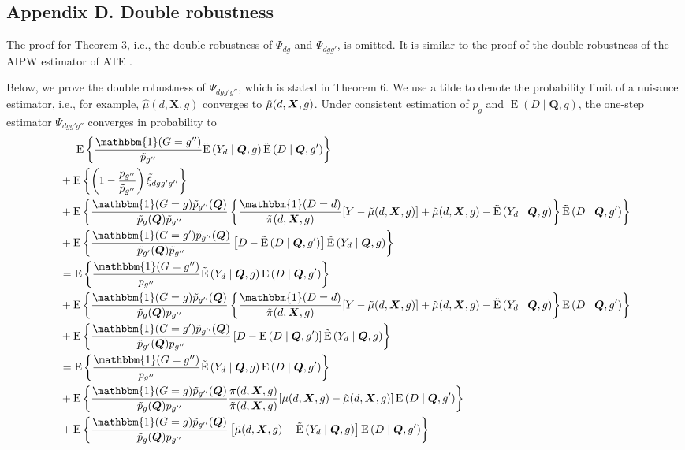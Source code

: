 \documentclass[12pt,a4paper]{article}
\newcommand{\E}{\operatorname{E}}
\def\X{{\boldsymbol X}}
\def\Q{{\boldsymbol Q}}
\def\one{\mathbbm{1}}
\begin{document}
\subsection*{Appendix D. Double robustness}
The proof for Theorem 3, i.e., the double robustness of $\Psi_{dg}$ and $\Psi_{dgg'}$, is omitted. It is similar to the proof of the double robustness of the AIPW estimator of ATE \citep{robins_estimation_1994, tsiatis_semiparametric_2006}.

Below, we prove the double robustness of $\Psi_{dgg'g''}$, which is stated in Theorem 6. 
We use a tilde to denote the probability limit of a nuisance estimator, i.e., for example, $\hat{\mu}(d,\X,g)$ converges to $\Tilde{\mu}(d,\X,g)$. 
Under consistent estimation of $p_g$ and $\E(D \mid \Q, g)$, the one-step estimator $\Psi_{dgg'g''}$ converges in probability to 
\begin{align*}
    &\phantom{{}={}} \E \left\{ \frac{\one(G=g'')}{\Tilde{p}_{g''}} \Tilde{\E} \left(Y_d \mid \Q, g \right) \Tilde{\E} \left(D \mid \Q, g' \right) \right\} \\
    &+ \E \left\{ \left( 1- \frac{p_{g''}}{\Tilde{p}_{g''}} \right) \Tilde{\xi}_{dgg'g''} \right\} \\
    &+ \E \left\{ \frac{\one(G=g) \Tilde{p}_{g''}(\Q)}{\Tilde{p}_g(\Q)\Tilde{p}_{g''}} \left\{ \frac{\one(D=d)}{\Tilde{\pi}(d,\X,g)} [Y-\Tilde{\mu}(d,\X,g)]+\Tilde{\mu}(d,\X,g) - \Tilde{\E} \left(Y_d \mid \Q,g \right) \right\} \Tilde{\E} \left(D \mid \Q,g' \right) \right\} \\
    &+ \E \left\{ \frac{\one(G=g')\Tilde{p}_{g''}(\Q)}{\Tilde{p}_{g'}(\Q)\Tilde{p}_{g''}} \left[ D-\Tilde{\E} \left(D \mid \Q, g' \right) \right] \Tilde{\E}\left( Y_d \mid \Q, g \right) \right\} 
    \\
    &= \E \left\{ \frac{\one(G=g'')}{p_{g''}} \Tilde{\E} \left(Y_d \mid \Q, g \right) \E \left(D \mid \Q, g' \right) \right\} \\
    &+ \E \left\{ \frac{\one(G=g) \Tilde{p}_{g''}(\Q)}{\Tilde{p}_g(\Q)p_{g''}} \left\{ \frac{\one(D=d)}{\Tilde{\pi}(d,\X,g)} [Y-\Tilde{\mu}(d,\X,g)]+\Tilde{\mu}(d,\X,g) - \Tilde{\E} \left(Y_d \mid \Q,g \right) \right\} \E \left(D \mid \Q,g' \right) \right\} \\
    &+ \E \left\{ \frac{\one(G=g')\Tilde{p}_{g''}(\Q)}{\Tilde{p}_{g'}(\Q) p_{g''}} \left[ D-\E \left(D \mid \Q, g' \right) \right] \Tilde{\E}\left( Y_d \mid \Q, g \right) \right\} \\
    &= \E \left\{ \frac{\one(G=g'')}{p_{g''}} \Tilde{\E} \left(Y_d \mid \Q, g \right) \E \left(D \mid \Q, g' \right) \right\} \\
    &+ \E \left\{ \frac{\one(G=g) \Tilde{p}_{g''}(\Q)}{\Tilde{p}_g(\Q)p_{g''}}  \frac{\pi(d,\X,g)}{\Tilde{\pi}(d,\X,g)} [\mu(d,\X,g)-\Tilde{\mu}(d,\X,g)]  \E \left(D \mid \Q,g' \right) \right\} \\
    &+ \E  \left\{ \frac{\one(G=g) \Tilde{p}_{g''}(\Q)}{\Tilde{p}_g(\Q)p_{g''}} \left[ \Tilde{\mu}(d,\X,g) - \Tilde{\E} \left(Y_d \mid \Q,g \right) \right]  \E \left(D \mid \Q,g' \right) \right\}
\end{align*}
\end{document}
